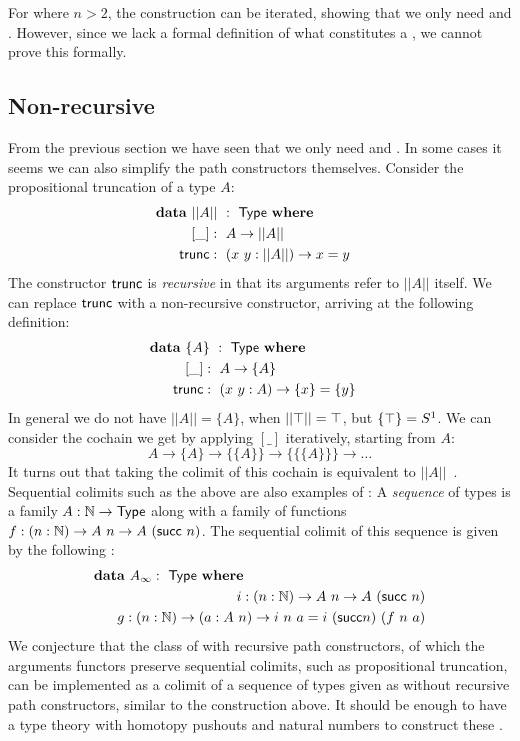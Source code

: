 \documentclass[a4paper,10pt]{report}
\begin{document}
For  where $n > 2$, the construction can be iterated,
showing that we only need \zeroconstructors and
\oneconstructors. However, since we lack a formal definition of what
constitutes a \hit, we cannot prove this formally.

\subsection{Non-recursive \hits}

From the previous section we have seen that we only need
\zeroconstructors and \oneconstructors. In some cases it seems we can
also simplify the path constructors themselves. Consider the
propositional truncation \hit of a type $A$:
%
\begin{alignat*}{2}
  &\rlap{$\data\ || A ||\ :\ \Type\ \where$} \\
  &&\ \ [\_]   &:\ A \to || A || \\
  &&\ \ \trunc &:\ (x\ y : || A ||) \to x = y
\end{alignat*}
%
The constructor $\mathsf{trunc}$ is \emph{recursive} in that its arguments
refer to $|| A ||$ itself. We can replace $\mathsf{trunc}$ with a
non-recursive constructor, arriving at the following definition:
%
\begin{alignat*}{2}
  &\rlap{$\data\ \{ A \}\ :\ \Type\ \where$} \\
  &&\ \ [\_]   &:\ A \to \{ A \} \\
  &&\ \ \trunc &:\ (x\ y : A) \to \{ x \} = \{ y \}
\end{alignat*}
%
In general we do not have $|| A || = \{ A \}$, \eg when
$|| \top || = \top$, but $\{ \top \} = S^1$. We can consider
the cochain we get by applying $[\_]$ iteratively, starting from $A$:
$$
A \to \{ A \} \to \{ \{ A \} \} \to \{ \{ \{ A \} \} \} \to \hdots
$$
It turns out that taking the colimit of this cochain is equivalent to
$|| A ||$~\cite{VanDoorn2015}. Sequential colimits such as the above
are also examples of \hits:
%
A \emph{sequence} of types is a family $A : \mathbb{N} \to \mathsf{Type}$ along with
a family of functions $f : (n : \mathbb{N}) \to A\ n \to A\ (\mathsf{succ}\ n)$. The
sequential colimit of this sequence is given by the following \hit:
%
\begin{alignat*}{2}
  &\rlap{$\data\ A_\infty :\ \Type\ \where$} \\
  &&\ \ i : (n : \Nat) \to A\ n \to A\ (\suc\ n) \\
  &&\ \ g : (n : \Nat) \to (a : A\ n) \to i\ n\ a = i\ (\suc n)\ (f\ n\ a)
\end{alignat*}
%
We conjecture that the class of \hits with recursive path
constructors, of which the arguments functors preserve sequential
colimits, such as propositional truncation, can be implemented as a
colimit of a sequence of types given as \hits without recursive path
constructors, similar to the construction above. It should be enough
to have a type theory with homotopy pushouts and natural numbers to
construct these \hits.
\end{document}

